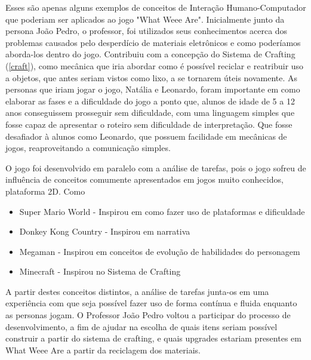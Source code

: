 Esses são apenas alguns exemplos de conceitos de Interação Humano-Computador que poderiam ser aplicados ao jogo "What Weee Are".
Inicialmente junto da persona João Pedro, o professor, foi utilizados seus conhecimentos acerca dos problemas causados pelo desperdício de materiais eletrônicos e como poderíamos aborda-los dentro do jogo. Contribuiu com a concepção do Sistema de Crafting (\ref{craft}), como mecânica que iria abordar como é possível reciclar e reatribuir uso a objetos, que antes seriam vistos como lixo, a se tornarem úteis novamente. As personas que iriam jogar o jogo, Natália e Leonardo, foram importante em como elaborar as fases e a dificuldade do jogo a ponto que, alunos de idade de 5 a 12 anos conseguissem prosseguir sem dificuldade, com uma linguagem simples que fosse capaz de apresentar o roteiro sem dificuldade de interpretação. Que fosse desafiador à alunos como Leonardo, que possuem facilidade em mecânicas de jogos, reaproveitando a comunicação simples. 
\par
O jogo foi desenvolvido em paralelo com a análise de tarefas, pois o jogo sofreu de influência de conceitos comumente apresentados em jogos muito conhecidos, plataforma 2D. Como
\begin{itemize}
    \item Super Mario World - Inspirou em como fazer uso de plataformas e dificuldade
    \item Donkey Kong Country - Inspirou em narrativa
    \item Megaman - Inspirou em conceitos de evolução de habilidades do personagem
    \item Minecraft - Inspirou no Sistema de Crafting
\end{itemize}

A partir destes conceitos distintos, a análise de tarefas junta-os em uma experiência com que seja possível fazer uso de forma contínua e fluida enquanto as personas jogam. O Professor João Pedro voltou a participar do processo de desenvolvimento, a fim de ajudar na escolha de quais itens seriam possível construir a partir do sistema de crafting, e quais upgrades estariam presentes em What Weee Are a partir da reciclagem dos materiais. 


